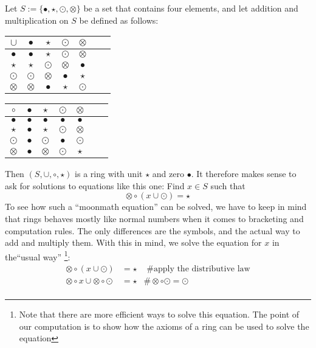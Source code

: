 \begin{example} Let $S:=\{\bullet,\star,\odot,\otimes\}$ be a set that contains four elements, and let addition and multiplication on $S$ be defined as follows:
\begin{center}
  \begin{tabular}{c | c c c c c c}
    $\cup$ & $\bullet$ & $\star$ & $\odot$ & $\otimes$ \\\hline
    $\bullet$ & $\bullet$ & $\star$ & $\odot$ & $\otimes$ \\
    $\star$ & $\star$ & $\odot$ & $\otimes$ & $\bullet$ \\
    $\odot$ & $\odot$ & $\otimes$ & $\bullet$ & $\star$ \\
    $\otimes$ & $\otimes$ & $\bullet$ & $\star$ & $\odot$ \\
  \end{tabular} \quad \quad \quad \quad
  \begin{tabular}{c | c c c c c c}
$ \circ $ & $\bullet$ & $\star$ & $\odot$ & $\otimes$ & \\\hline
        $\bullet$ & $\bullet$ & $\bullet$ & $\bullet$ & $\bullet$ &\\
        $\star$ & $\bullet$ & $\star$ & $\odot$ & $\otimes$ &\\
        $\odot$ & $\bullet$ & $\odot$ & $\bullet$ & $\odot$ &\\
        $\otimes$ & $\bullet$ & $\otimes$ & $\odot$ & $\star$ &\\
  \end{tabular}
\end{center}
Then $(S,\cup,\circ, \star)$ is a ring with unit $\star$ and zero $\bullet$. It therefore makes sense to ask for solutions to equations like this one:
Find $x\in S$ such that
$$
\otimes \circ (x \cup \odot ) = \star
$$
To see how such a ``moonmath equation'' can be solved, we have to keep in mind that rings behaves mostly like normal numbers when it comes to bracketing and computation rules. The only differences are the symbols, and the actual way to add and multiply them. With this in mind, we solve the equation for $x$ in the``usual way'' \footnote{Note that there are more efficient ways to solve this equation. The point of our computation is to show how the axioms of a ring can be used to solve the equation}:
\begin{align*}
\otimes \circ (x \cup \odot ) &= \star & \text{ \# apply the distributive law}\\
\otimes \circ x \cup \otimes \circ \odot  &= \star &\# \otimes \circ \odot = \odot\\

\end{align*}
\end{example}
